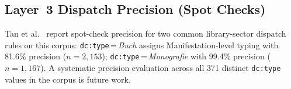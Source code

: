 
\subsection{Layer~3 Dispatch Precision (Spot Checks)}

Tan et al.~\cite{tan2026mocho} report spot-check precision for two common
library-sector dispatch rules on this corpus:
\texttt{dc:type}\,=\,\textit{Buch} assigns Manifestation-level typing with
81.6\% precision ($n{=}2{,}153$);
\texttt{dc:type}\,=\,\textit{Monografie} with 99.4\% precision
($n{=}1{,}167$).
A systematic precision evaluation across all 371 
distinct \texttt{dc:type} values in the corpus is future work.
